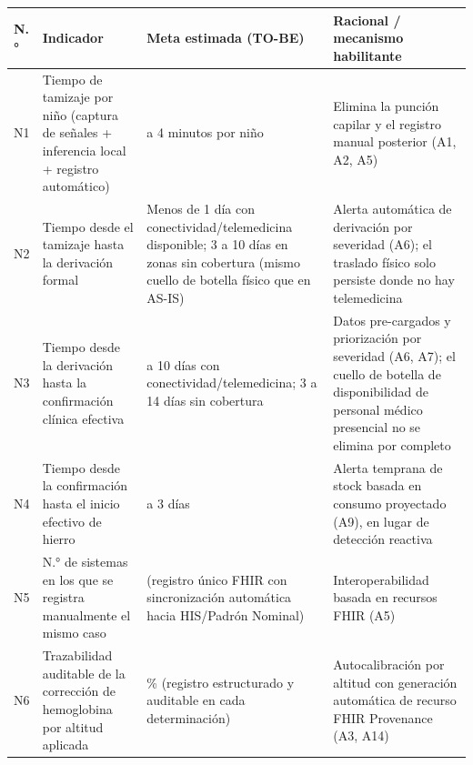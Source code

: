 \documentclass[11pt,a4paper]{article}
\begin{document}
{\small
\begin{longtable}[]{@{}
  >{\raggedright\arraybackslash}p{}
  >{\raggedright\arraybackslash}p{}
  >{\raggedright\arraybackslash}p{}
  >{\raggedright\arraybackslash}p{}@{}}
\toprule\noalign{}
\begin{minipage}[b]{\linewidth}\raggedright
N.°
\end{minipage} & \begin{minipage}[b]{\linewidth}\raggedright
Indicador
\end{minipage} & \begin{minipage}[b]{\linewidth}\raggedright
Meta estimada (TO-BE)
\end{minipage} & \begin{minipage}[b]{\linewidth}\raggedright
Racional / mecanismo habilitante
\end{minipage} \\
\midrule\noalign{}
\endhead
\bottomrule\noalign{}
\endlastfoot
N1 & Tiempo de tamizaje por niño (captura de señales + inferencia local + registro automático) & 2 a 4 minutos por niño & Elimina la punción capilar y el registro manual posterior (A1, A2, A5) \\
N2 & Tiempo desde el tamizaje hasta la derivación formal & Menos de 1 día con conectividad/telemedicina disponible; 3 a 10 días en zonas sin cobertura (mismo cuello de botella físico que en AS-IS) & Alerta automática de derivación por severidad (A6); el traslado físico solo persiste donde no hay telemedicina \\
N3 & Tiempo desde la derivación hasta la confirmación clínica efectiva & 3 a 10 días con conectividad/telemedicina; 3 a 14 días sin cobertura & Datos pre-cargados y priorización por severidad (A6, A7); el cuello de botella de disponibilidad de personal médico presencial no se elimina por completo \\
N4 & Tiempo desde la confirmación hasta el inicio efectivo de hierro & 0 a 3 días & Alerta temprana de stock basada en consumo proyectado (A9), en lugar de detección reactiva \\
N5 & N.° de sistemas en los que se registra manualmente el mismo caso & 1 (registro único FHIR con sincronización automática hacia HIS/Padrón Nominal) & Interoperabilidad basada en recursos FHIR (A5) \\
N6 & Trazabilidad auditable de la corrección de hemoglobina por altitud aplicada & 100 \% (registro estructurado y auditable en cada determinación) & Autocalibración por altitud con generación automática de recurso FHIR Provenance (A3, A14) \\

\end{longtable}}
\end{document}

